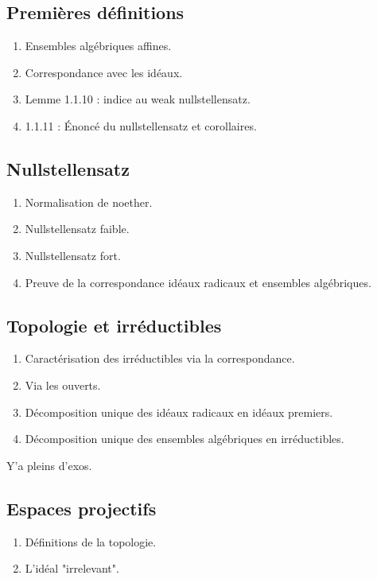 \documentclass[a4paper,12pt]{book}
\theoremstyle{plain}
\theoremstyle{definition}
\theoremstyle{remark}
\begin{document}
\subsection{Premières définitions}

\begin{enumerate}
    \item Ensembles algébriques affines.
    \item Correspondance avec les idéaux.
    \item Lemme 1.1.10 : indice au weak nullstellensatz.
    \item 1.1.11 : Énoncé du nullstellensatz et corollaires.
\end{enumerate}
\subsection{Nullstellensatz}
\begin{enumerate}
    \item Normalisation de noether.
    \item Nullstellensatz faible.
    \item Nullstellensatz fort.
    \item Preuve de la correspondance idéaux radicaux et ensembles
	algébriques.
\end{enumerate}

\subsection{Topologie et irréductibles}
\begin{enumerate}
    \item Caractérisation des irréductibles via la correspondance.
    \item Via les ouverts.
    \item Décomposition unique des idéaux radicaux en idéaux premiers.
    \item Décomposition unique des ensembles algébriques en 
	irréductibles.
\end{enumerate}
Y'a pleins d'exos.

\subsection{Espaces projectifs}
\begin{enumerate}
    \item Définitions de la topologie.
    \item L'idéal "irrelevant".
\end{enumerate}
\end{document}
